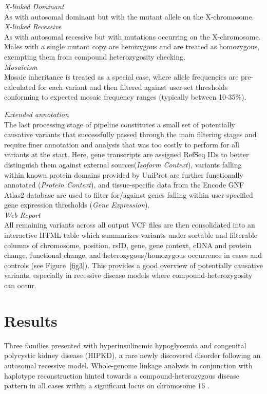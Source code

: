 \documentclass[twocolumn]{bmcart}%
\newcommand{\triplesub}[2]{\noindent\textsl{#1}\\#2\\}  %
\newcommand{\changes}[1]{{\color{red} #1}}
\begin{document}
{{	\triplesub{X-linked Dominant}{As with autosomal dominant but with the mutant allele on the X-chromosome.}
	
	\triplesub{X-linked Recessive}{As with autosomal recessive but with mutations occurring on the X-chromosome. Males with a single mutant copy are hemizygous and are treated as homozygous, exempting them from compound heterozygosity checking.}
	
	\triplesub{Mosaicism}{Mosaic inheritance is treated as a special case, where allele frequencies are pre-calculated for each variant and then filtered against user-set thresholds conforming to expected mosaic frequency ranges (typically between 10-35\%).}
}

\changes{\triplesub{Extended annotation}{The last processing stage of pipeline constitutes a small set of potentially causative variants that successfully passed through the main filtering stages and require finer annotation and analysis that was too costly to perform for all variants at the start. Here, gene transcripts are assigned RefSeq IDs to better distinguish them against external sources(\textit{Isoform Context}), variants falling within known protein domains provided by UniProt are further functionally annotated (\textit{Protein Context}), and tissue-specific data from the Encode GNF Atlas2 database are used to filter for/against genes falling within user-specified gene expression thresholds (\textit{Gene Expression}).}

\triplesub{Web Report}{All remaining variants across all output VCF files are then consolidated into an interactive HTML table which summarizes variants under sortable and filterable columns of chromosome, position, rsID, gene, gene context, cDNA and protein change, functional change, and heterozygous/homozygous occurrence in cases and controls (see Figure~\ref{fig3}). This provides a good overview of potentially causative variants, especially in recessive disease models where compound-heterozygosity can occur.
}}
}

\section*{Results}


Three families presented with hyperinsulinemic hypoglycemia and congenital polycystic kidney disease (HIPKD), a rare newly discovered disorder following an autosomal recessive model. Whole-genome linkage analysis in conjunction with haplotype reconstruction hinted towards a compound-heterozygous disease pattern in all cases within a significant locus on chromosome 16 \cite{cabezas2017polycystic}.
\end{document}

